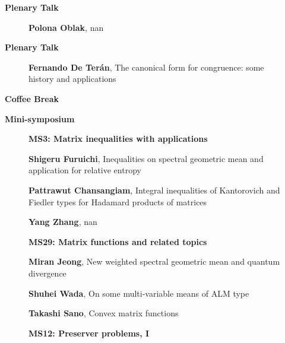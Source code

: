 \documentclass[ILAS2025-program.tex]{subfiles}
\begin{document}
    \begin{description}
    \item[] \textbf{Plenary Talk} 
    \begin{description}
        \item[] \textbf{Polona Oblak}, nan
        \end{description}
        \item[] \textbf{Plenary Talk} 
    \begin{description}
        \item[] \textbf{Fernando De Terán}, The canonical form for congruence: some history and applications
        \end{description}
        \item[] \textbf{Coffee Break} 
    \item[] \textbf{Mini-symposium} 
    \begin{description}
    \item[] {\color{mstitle}\textbf{MS3: Matrix inequalities with applications}} 
    \item[] \textbf{Shigeru Furuichi}, Inequalities on spectral geometric mean and application for relative entropy
        \item[] \textbf{Pattrawut Chansangiam}, Integral inequalities of Kantorovich and Fiedler types for Hadamard products of matrices
        \item[] \textbf{Yang Zhang}, nan
        \end{description}
    \begin{description}
    \item[] {\color{mstitle}\textbf{MS29: Matrix functions and related topics}} 
    \item[] \textbf{Miran Jeong}, New weighted spectral geometric mean and quantum divergence
        \item[] \textbf{Shuhei Wada}, On some multi-variable means of ALM type
        \item[] \textbf{Takashi Sano}, Convex matrix functions
        \end{description}
    \begin{description}
    \item[] {\color{mstitle}\textbf{MS12: Preserver problems, I}} 

\end{description}
\end{description}
\end{document}
